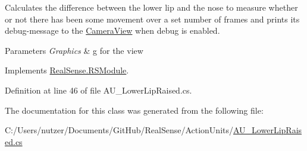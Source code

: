 Calculates the difference between the lower lip and the nose to measure whether or not there has been some movement over a set number of frames and prints its\textquotesingle{} debug-\/message to the \hyperlink{class_real_sense_1_1_camera_view}{Camera\+View} when debug is enabled. 
\begin{DoxyParams}{Parameters}
{\em Graphics} & g for the view \\
\hline
\end{DoxyParams}


Implements \hyperlink{class_real_sense_1_1_r_s_module_a2ec830b7932ee7c0077d473f81c73867}{Real\+Sense.\+R\+S\+Module}.



Definition at line 46 of file A\+U\+\_\+\+Lower\+Lip\+Raised.\+cs.



The documentation for this class was generated from the following file\+:\begin{DoxyCompactItemize}
\item 
C\+:/\+Users/nutzer/\+Documents/\+Git\+Hub/\+Real\+Sense/\+Action\+Units/\hyperlink{_a_u___lower_lip_raised_8cs}{A\+U\+\_\+\+Lower\+Lip\+Raised.\+cs}\end{DoxyCompactItemize}
